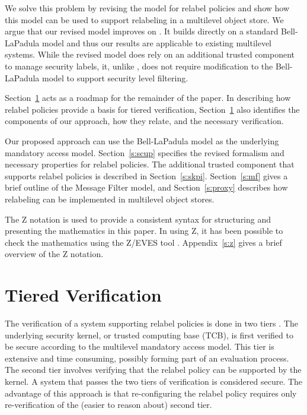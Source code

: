 We solve this problem by  revising the model for relabel policies
and show how this model can be used to support relabeling in a
multilevel object store.  We argue that our revised model improves on
\cite{FGQ:oak:96}. It builds directly on a standard Bell-LaPadula  model
and thus our results are applicable to existing multilevel systems.
While the revised model does rely on an additional trusted component to
manage security labels, it, unlike \cite{FGQ:oak:96}, does not require
modification to the Bell-LaPadula model to support security
level filtering.

Section~\ref{s:tier} acts as a roadmap for the remainder of the paper.
In describing how relabel policies provide a basis for tiered
verification, Section~\ref{s:tier} also identifies the 
components of our approach, 
how they relate, and the necessary verification.

Our proposed approach can use the Bell-LaPadula model as the
underlying mandatory access model. Section~\ref{s:scup} specifies the
revised formalism and necessary properties for relabel  policies.
The additional trusted component that supports relabel policies is
described in Section~\ref{s:skpi}.
Section~\ref{s:mf} gives a brief outline of the Message Filter model, and
Section~\ref{s:proxy} describes how relabeling can be implemented in 
multilevel object stores.

The Z notation \cite{Spivey92} is used to provide a consistent syntax
for structuring and presenting the mathematics in this paper.  In using
Z, it has been possible to check the mathematics using the Z/EVES tool \cite{saaltink:97}.
Appendix~\ref{s:z} gives a brief overview of the Z notation.

\section{Tiered Verification} \label{s:tier}

The verification of a system supporting relabel policies is done in two
tiers \cite{FGQ:oak:96}.  The underlying security kernel, or trusted
computing base (TCB), is first verified to be secure according to the
multilevel mandatory access model.  This  tier is extensive and time
consuming, possibly forming part of an evaluation process.  The second
tier involves verifying that the relabel policy can be supported by the kernel. A system that passes the two tiers of verification is
considered secure.  The advantage of this approach is that
re-configuring the relabel policy requires only re-verification of the
(easier to reason about) second tier.

